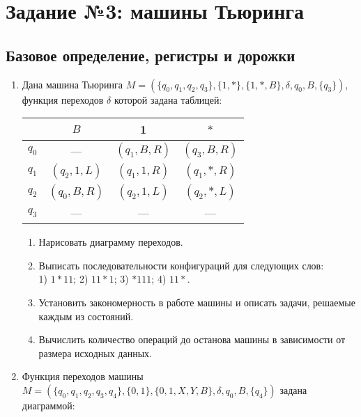 \documentclass[12pt,a4paper]{article}
\begin{document}
\section*{Задание №3: машины Тьюринга}

\subsection*{Базовое определение, регистры и дорожки}

\begin{enumerate}[itemsep=0pt]
\item Дана машина Тьюринга
$M=\left(\{q_0, q_1, q_2, q_3\},\{1,*\},\{1,*,B\},\delta,q_0,B,\{q_3\}\right)$, функция
переходов $\delta$ которой задана таблицей:
\begin{center}
  \begin{tabular}[t]{c||c|c|c}
     & $B$ & 1 & $*$\\
    \hline\hline
    $q_0$ & --- &$(q_1,B,R)$& $(q_3,B,R)$\\
    $q_1$ &$(q_2,1,L)$  &$(q_1,1,R)$& $(q_1,*,R)$\\
    $q_2$ &$(q_0,B,R)$  &$(q_2,1,L)$& $(q_2,*,L)$\\
    $q_3$ & --- & --- & ---
  \end{tabular}
  
\end{center}

\begin{enumerate}[itemsep=0pt]
\item Нарисовать диаграмму переходов.
\item Выписать последовательности конфигураций для следующих слов:\\ 1) $1*11$; 2) $11*1$; 
3) $*111$; 4) $11*$. 
\item Установить закономерность в работе машины и описать задачи, 
решаемые каждым из состояний. 
\item Вычислить количество
операций до останова машины в зависимости от размера исходных данных.
\end{enumerate}

\item Функция переходов машины  
$M=\left(\{q_0, q_1, q_2, q_3, q_4\},\{0, 1\},\{0,1,X,Y,B\},\delta,q_0,B,\{q_4\}\right)$  задана
диаграммой:
\vspace{-3mm}
\begin{center}
\end{center}
\end{enumerate}
\end{document}

